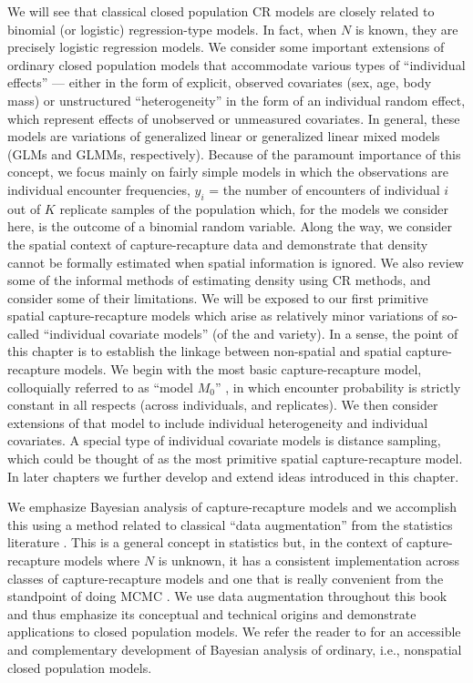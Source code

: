We will
see that classical closed population CR models are closely related to binomial (or logistic)
regression-type models. In fact, when $N$ is known, they are precisely
logistic regression models.  We consider some important extensions of ordinary closed
population models that accommodate various types of ``individual
effects'' --- either in the form of explicit, observed %
covariates (sex, age,
body mass) or unstructured ``heterogeneity'' in the form of an
individual random effect, which represent effects of unobserved or
unmeasured covariates. In general, these models are variations of
generalized linear or generalized linear mixed models (GLMs and GLMMs, respectively).
Because of the paramount importance of this concept, we focus mainly
on fairly simple models in which the observations are individual
encounter frequencies, $y_{i}$ = the number of encounters of
individual $i$ out of $K$ replicate samples of the population which,
for the models we consider here, is the outcome of a binomial random
variable.  Along the way, we consider the spatial context of
capture-recapture data %
and demonstrate that density cannot
be formally estimated when spatial information is ignored. We also
review some of the informal methods of estimating density using CR
methods, and consider some of their limitations.  We will be exposed
to our first primitive spatial capture-recapture models which arise as
relatively minor variations of so-called ``individual covariate
models'' (of the \citet{huggins:1989} and \citet{alho:1990}
variety). In a sense, the point of this chapter is to establish the 
linkage  between non-spatial and spatial capture-recapture models.
We begin with the most basic
 capture-recapture model, colloquially referred to as ``model $M_0$''
 \citep{otis_etal:1978}, in which encounter probability is strictly
 constant in all respects (across individuals, and replicates). We
 then consider 
 extensions of that model to include individual
heterogeneity and individual covariates. A special type of
individual covariate models is distance sampling, which could be
thought of as the most primitive spatial capture-recapture model. In
later chapters we further develop and extend ideas introduced in this
chapter.

We emphasize Bayesian analysis of capture-recapture models and we
accomplish this using a method related to classical ``data
augmentation'' from the statistics literature
\citep[e.g.,][]{tanner_wong:1987}.  This is a general concept in
statistics but, in the context of capture-recapture models where $N$
is unknown, it has a consistent implementation across classes of
capture-recapture models and one that is really convenient from the
standpoint of doing MCMC \citep{royle_etal:2007,royle_dorazio:2011}. We use data
augmentation throughout this book and thus emphasize its conceptual
and technical origins and demonstrate applications to closed
population models.  We refer the reader to
\citet[][ch. 6]{kery_schaub:2011} for an accessible and complementary
development of Bayesian analysis of ordinary, i.e., nonspatial closed population models.


